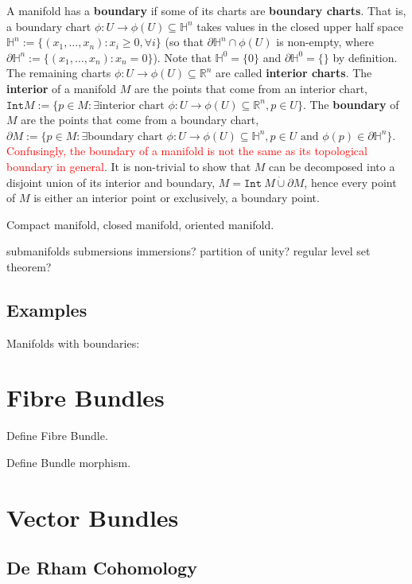 \documentclass[a4paper]{article}
\theoremstyle{definition} \newtheorem*{definition}{Definition}
\theoremstyle{definition} \newtheorem*{definitions}{Definitions}
\theoremstyle{plain} \newtheorem{theorem}{Theorem}[section]
\theoremstyle{plain} \newtheorem{proposition}[theorem]{Proposition}
\theoremstyle{plain} \newtheorem{corollary}[theorem]{Corollary}
\theoremstyle{plain} \newtheorem{lemma}[theorem]{Lemma}
\theoremstyle{plain} \newtheorem{example}[theorem]{Example}
\newcommand{\checkCorrect}[1]{\textcolor{red}{#1}}
\newcommand{\defn}[1]{\textbf{#1}}
\newcommand{\realnos}{\mathbb{R}}
\begin{document}
A manifold has a \defn{boundary} if some of its charts are \defn{boundary charts}. That is, a boundary chart $\phi:U\to \phi(U)\subseteq \mathbb{H}^n$ takes values in the closed upper half space $\mathbb{H}^n := \{(x_1, \ldots, x_n): x_i\geq 0, \forall i\}$ (so that $\partial \mathbb{H}^n \cap \phi(U)$ is non-empty, where $\partial \mathbb{H}^n := \{(x_1, \ldots, x_n): x_n=0\}$). Note that $\mathbb{H}^0 = \{0\}$ and $\partial \mathbb{H}^0 = \{\}$ by definition. The remaining charts $\phi:U\to \phi(U)\subseteq \realnos^n$ are called \defn{interior charts}. The \defn{interior} of a manifold $M$ are the points that come from an interior chart, $\texttt{Int} M := \{p\in M: \exists \textrm{interior chart } \phi:U\to \phi(U)\subseteq \realnos^n, p\in U \}$. The \defn{boundary} of $M$ are the points that come from a boundary chart, $\partial M:=\{p\in M: \exists \textrm{boundary chart } \phi:U\to \phi(U)\subseteq \mathbb{H}^n, p\in U \textrm{ and } \phi(p)\in \partial \mathbb{H}^n \}$. \checkCorrect{Confusingly, the boundary of a manifold is not the same as its topological boundary in general}. It is non-trivial to show that $M$ can be decomposed into a disjoint union of its interior and boundary, $M = \texttt{Int} \ M \mathbin{\dot{\cup}} \partial M$, hence every point of $M$ is either an interior point or exclusively, a boundary point.

Compact manifold, closed manifold, oriented manifold.

submanifolds submersions immersions? partition of unity? regular level set theorem?

\subsection{Examples}

Manifolds with boundaries: 

\section{Fibre Bundles}

Define Fibre Bundle.

Define Bundle morphism.

\section{Vector Bundles}

\subsection{De Rham Cohomology}
\end{document}
